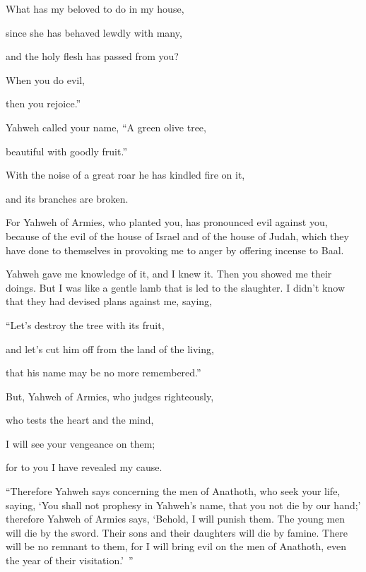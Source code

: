 {\par }{\Q {}What has my beloved to do in my house,
\par }{\QB since she has behaved lewdly with many,
\par }{\QB and the holy flesh has passed from you?
\par }{\Q When you do evil,
\par }{\QB then you rejoice.”
\par }{\BB \par }{\Q {}Yahweh called your name, “A green olive tree,
\par }{\QB beautiful with goodly fruit.”
\par }{\Q With the noise of a great roar he has kindled fire on it,
\par }{\QB and its branches are broken.
\par }{\MM {}For Yahweh of Armies, who planted you, has pronounced evil against you, because of the evil of the house of Israel and of the house of Judah, which they have done to themselves in provoking me to anger by offering incense to Baal.
\par }{\PP {}Yahweh gave me knowledge of it, and I knew it. Then you showed me their doings.
But I was like a gentle lamb that is led to the slaughter. I didn’t know that they had devised plans against me, saying,
\par }{\Q “Let’s destroy the tree with its fruit,
\par }{\QB and let’s cut him off from the land of the living,
\par }{\QB that his name may be no more remembered.”
\par }{\Q {}But, Yahweh of Armies, who judges righteously,
\par }{\QB who tests the heart and the mind,
\par }{\Q I will see your vengeance on them;
\par }{\QB for to you I have revealed my cause.
\par }{\PP {}“Therefore Yahweh says concerning the men of Anathoth, who seek your life, saying, ‘You shall not prophesy in Yahweh’s name, that you not die by our hand;’
therefore Yahweh of Armies says, ‘Behold, I will punish them. The young men will die by the sword. Their sons and their daughters will die by famine.
There will be no remnant to them, for I will bring evil on the men of Anathoth, even the year of their visitation.’ ”

}
